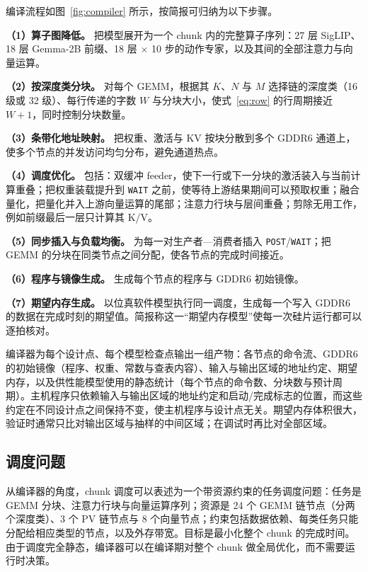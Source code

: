 \documentclass[a4paper,10.5pt]{ctexart}
\begin{document}
编译流程如图~\ref{fig:compiler} 所示，按简报可归纳为以下步骤。

\textbf{（1）算子图降低。} 把模型展开为一个 chunk 内的完整算子序列：27 层 SigLIP、18 层 Gemma-2B 前缀、18 层 $\times$ 10 步的动作专家，以及其间的全部注意力与向量运算。

\textbf{（2）按深度类分块。} 对每个 GEMM，根据其 $K$、$N$ 与 $M$ 选择链的深度类（16 级或 32 级）、每行传递的字数 $W$ 与分块大小，使式~\eqref{eq:row} 的行周期接近 $W+1$，同时控制分块数量。

\textbf{（3）条带化地址映射。} 把权重、激活与 KV 按块分散到多个 GDDR6 通道上，使多个节点的并发访问均匀分布，避免通道热点。

\textbf{（4）调度优化。} 包括：双缓冲 feeder，使下一行或下一分块的激活装入与当前计算重叠；把权重装载提升到 \texttt{WAIT} 之前，使等待上游结果期间可以预取权重；融合量化，把量化并入上游向量运算的尾部；注意力行块与层间重叠；剪除无用工作，例如前缀最后一层只计算其 K/V。

\textbf{（5）同步插入与负载均衡。} 为每一对生产者—消费者插入 \texttt{POST}/\texttt{WAIT}；把 GEMM 的分块在同类节点之间分配，使各节点的完成时间接近。

\textbf{（6）程序与镜像生成。} 生成每个节点的程序与 GDDR6 初始镜像。

\textbf{（7）期望内存生成。} 以位真软件模型执行同一调度，生成每一个写入 GDDR6 的数据在完成时刻的期望值。简报称这一“期望内存模型”使每一次硅片运行都可以逐拍核对。

编译器为每个设计点、每个模型检查点输出一组产物：各节点的命令流、GDDR6 的初始镜像（程序、权重、常数与查表内容）、输入与输出区域的地址约定、期望内存，以及供性能模型使用的静态统计（每个节点的命令数、分块数与预计周期）。主机程序只依赖输入与输出区域的地址约定和启动/完成标志的位置，而这些约定在不同设计点之间保持不变，使主机程序与设计点无关。期望内存体积很大，验证时通常只比对输出区域与抽样的中间区域；在调试时再比对全部区域。

\subsection{调度问题}

从编译器的角度，chunk 调度可以表述为一个带资源约束的任务调度问题：任务是 GEMM 分块、注意力行块与向量运算序列；资源是 24 个 GEMM 链节点（分两个深度类）、3 个 PV 链节点与 8 个向量节点；约束包括数据依赖、每类任务只能分配给相应类型的节点，以及外存带宽。目标是最小化整个 chunk 的完成时间。由于调度完全静态，编译器可以在编译期对整个 chunk 做全局优化，而不需要运行时决策。
\end{document}
